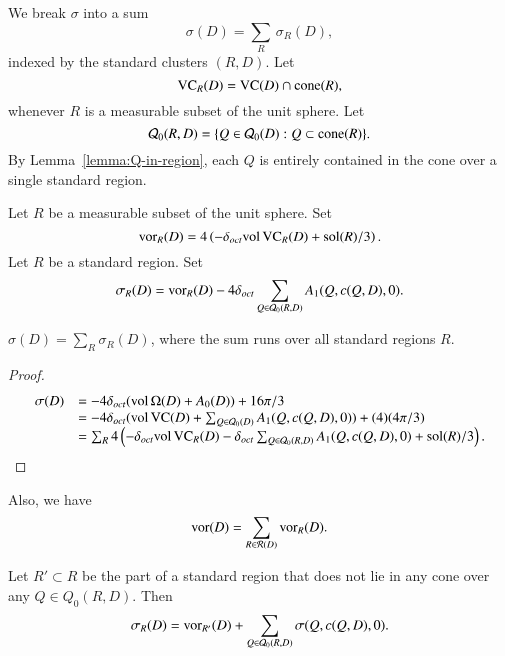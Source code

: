 
We break $\sigma$ into a sum
   \begin{equation}
   \sigma(D) = \sum_R\,\sigma_R(D),
   \end{equation}
indexed by the standard clusters $(R,D)$.  Let
   $$
   {\operatorname{VC}}_R(D) = {\operatorname{VC}}(D)\cap {\operatorname{cone}}(R),
   $$
whenever $R$ is a measurable subset of the unit sphere.  Let
   $$
   {\mathcal Q}_0(R,D) = \{Q\in {\mathcal Q}_0(D) : Q\subset {\operatorname{cone}}(R)\}.
   $$
By Lemma~\ref{lemma:Q-in-region},
 each $Q$ is entirely contained in the cone over a single
standard region.

\begin{definition} \label{def:score-std-region}
   Let $R$ be a measurable subset of the unit sphere.  Set
      $$
      \operatorname{vor}_R(D) =4\left(-\delta_{oct} {\operatorname{vol}}\,{\operatorname{VC}}_R(D)  +
      \operatorname{sol}(R)/3\right).
      $$
      Let $R$ be a standard region. Set
      $$
      \sigma_R(D) = \operatorname{vor}_R(D) - 4\delta_{oct}
         \sum_{Q\in{\mathcal Q}_0(R,D)} A_1(Q,c(Q,D),0).
      $$
 
\end{definition}

\begin{lemma} $\sigma(D) = \sum_R\sigma_R(D)$, where the sum runs
over all standard regions $R$.
\end{lemma}

\begin{proof}
   $$
   \begin{array}{lll}
      \sigma(D)
      &= -4\delta_{oct} ({\operatorname{vol}}\,\Omega(D) + A_0(D))+16\pi/3\\
      &= -4\delta_{oct} ({\operatorname{vol}}\,{\operatorname{VC}}(D)+\sum_{Q\in{\mathcal Q}_0(D)}
         A_1(Q,c(Q,D),0)) + (4) (4\pi/3)\\
      &= \sum_R 4\left (-\delta_{oct} {\operatorname{vol}}\,{\operatorname{VC}}_R(D) -\delta_{oct}
         \sum_{Q\in{\mathcal Q}_0(R,D)} A_1(Q,c(Q,D),0) +
         \operatorname{sol}(R)/3\right).
   \end{array}
   $$
\end{proof}

Also, we have
    \begin{equation}
    {\operatorname{vor}}(D)=\sum_{R\in {\mathcal R}(D)}
    {\operatorname{vor}}_R(D).
    \label{eqn:vorD}
    \end{equation}

\begin{lemma}\label{lemma:R'}
Let $R'\subset R$ be the part of a standard region that does not
lie in any cone over any $Q\in Q_0(R,D)$.  Then
   $$
   \sigma_R(D) = \operatorname{vor}_{R'}(D)
      + \sum_{Q\in{\mathcal Q}_0(R,D)} \sigma(Q,c(Q,D),0).
   $$
\end{lemma}

